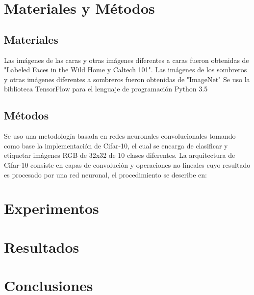 \documentclass[10pt,twocolumn,letterpaper]{article}
\begin{document}
\section{Materiales y Métodos}
\subsection{Materiales}
Las imágenes de las caras y otras imágenes diferentes a caras fueron obtenidas de "Labeled Faces in the Wild Home y Caltech 101".
Las imágenes de los sombreros y otras imágenes diferentes a sombreros fueron obtenidas de "ImageNet"
Se uso la biblioteca TensorFlow para el lenguaje de programación Python 3.5

\subsection{Métodos}
Se uso una metodología basada en redes neuronales convolucionales tomando como base la implementación de Cifar-10, el cual se encarga de clasificar y etiquetar imágenes RGB de 32x32 de 10 clases diferentes. La arquitectura de Cifar-10 consiste en capas de convolución y operaciones no lineales cuyo resultado es procesado por una red neuronal, el procedimiento se describe en: %

\section{Experimentos}

\section{Resultados}

\section{Conclusiones}
\end{document}
